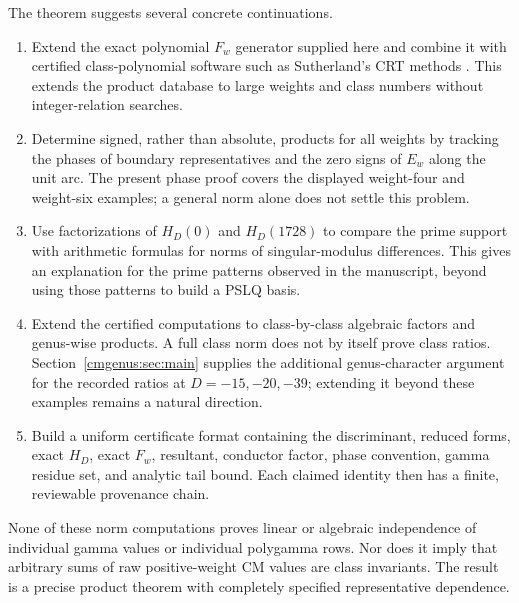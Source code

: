 The theorem suggests several concrete continuations.
\begin{enumerate}
\item Extend the exact polynomial $F_w$ generator supplied here and combine it with
certified class-polynomial software such as Sutherland's CRT methods
\cite{cmnorm:Sutherland}. This extends the product database to large
weights and class numbers without integer-relation searches.
\item Determine signed, rather than absolute, products for all weights
by tracking the phases of boundary representatives and the zero signs
of $E_w$ along the unit arc. The present phase proof covers the displayed
weight-four and weight-six examples; a general norm alone does not
settle this problem.
\item Use factorizations of $H_D(0)$ and $H_D(1728)$ to compare the prime
support with arithmetic formulas for norms of singular-modulus
differences. This gives an explanation for the prime patterns observed
in the manuscript, beyond using those patterns to build a PSLQ basis.
\item Extend the certified computations to class-by-class algebraic
factors and genus-wise products. A full class norm does not by itself
prove class ratios. Section~\ref{cmgenus:sec:main} supplies the additional
genus-character argument for the recorded ratios at $D=-15,-20,-39$;
extending it beyond these examples remains a natural direction.
\item Build a uniform certificate format containing the discriminant,
reduced forms, exact $H_D$, exact $F_w$, resultant, conductor factor,
phase convention, gamma residue set, and analytic tail bound. Each
claimed identity then has a finite, reviewable provenance chain.
\end{enumerate}

None of these norm computations proves linear or algebraic independence
of individual gamma values or individual polygamma rows. Nor does it
imply that arbitrary sums of raw positive-weight CM values are class
invariants. The result is a precise product theorem with completely
specified representative dependence.
